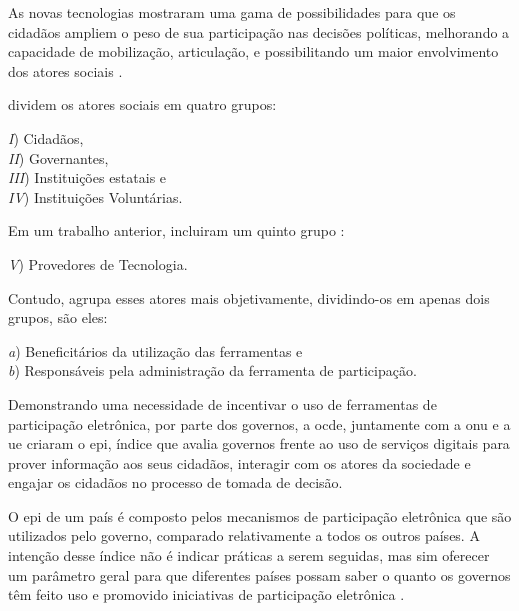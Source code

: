 As novas tecnologias mostraram uma gama de possibilidades para que os cidadãos ampliem o peso de sua participação nas decisões políticas,
melhorando a capacidade de mobilização, articulação, e possibilitando um maior envolvimento dos atores sociais \cite{araujo2015democracia}.\\

\par
{} dividem os atores sociais em quatro grupos: 

\begin{minipage}{.66\textwidth}	
   \textit{I}) Cidadãos, \\
   \textit{II}) Governantes, \\
   \textit{III}) Instituições estatais e \\
   \textit{IV}) Instituições Voluntárias. \\
\end{minipage}

\par
Em um trabalho anterior,  incluiram um quinto grupo :

\begin{minipage}{.66\textwidth}	
    \textit{V}) Provedores de Tecnologia.
\end{minipage}	

\par
Contudo,  agrupa esses atores mais objetivamente, dividindo-os em apenas dois grupos, são eles:\\

\begin{minipage}{.66\textwidth}	
   \textit{a}) Beneficitários da utilização das ferramentas e \\
   \textit{b}) Responsáveis pela administração da ferramenta de participação.  \\
\end{minipage}

\par
Demonstrando uma necessidade de incentivar o uso de ferramentas de participação eletrônica, por parte dos governos,  a \acrfull{ocde}, juntamente com a \acrshort{onu} 
e a \acrfull{ue} criaram o \acrfull{epi}, índice que avalia governos frente ao uso de serviços digitais para prover informação aos seus cidadãos, interagir com os atores da 
sociedade e engajar os cidadãos no processo de tomada de decisão. 

\par 
O \acrshort{epi} de um país é composto pelos mecanismos de participação eletrônica que são utilizados pelo governo, comparado relativamente a todos os outros países.
A intenção desse índice não é indicar práticas a serem seguidas, mas sim oferecer um parâmetro geral para que diferentes países possam saber o quanto os governos têm 
feito uso e promovido iniciativas de participação eletrônica \cite{onu2018} .

